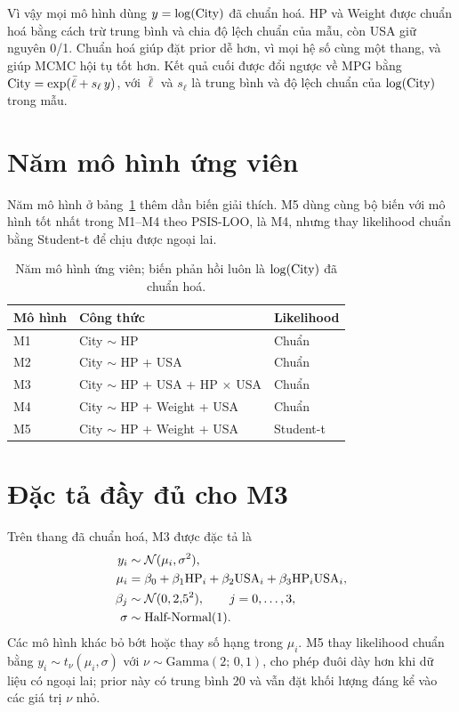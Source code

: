 \documentclass[12pt,a4paper]{report}
\begin{document}

Vì vậy mọi mô hình dùng $y = \log(\mathrm{City})$ đã chuẩn hoá. HP và Weight được
chuẩn hoá bằng cách trừ trung bình và chia độ lệch chuẩn của mẫu, còn USA giữ
nguyên 0/1. Chuẩn hoá giúp đặt prior dễ hơn, vì mọi hệ số cùng một thang, và
giúp MCMC hội tụ tốt hơn. Kết quả cuối được đổi ngược về MPG bằng
$\mathrm{City} = \exp(\bar{\ell} + s_\ell\, y)$, với $\bar{\ell}$ và $s_\ell$ là trung
bình và độ lệch chuẩn của $\log(\mathrm{City})$ trong mẫu.

\section{Năm mô hình ứng viên}
\label{sec:candidates}

Năm mô hình ở bảng~\ref{tab:models} thêm dần biến giải thích. M5 dùng cùng bộ
biến với mô hình tốt nhất trong M1--M4 theo PSIS-LOO, là M4, nhưng thay
likelihood chuẩn bằng Student-t để chịu được ngoại lai.

\begin{table}[tp]
  \centering
  \caption{Năm mô hình ứng viên; biến phản hồi luôn là $\log(\mathrm{City})$ đã chuẩn
    hoá.}
  \label{tab:models}
  \begin{tabular}{lll}
    \toprule
    Mô hình & Công thức & Likelihood \\
    \midrule
    M1 & City $\sim$ HP                        & Chuẩn \\
    M2 & City $\sim$ HP + USA                  & Chuẩn \\
    M3 & City $\sim$ HP + USA + HP $\times$ USA & Chuẩn \\
    M4 & City $\sim$ HP + Weight + USA         & Chuẩn \\
    M5 & City $\sim$ HP + Weight + USA         & Student-t \\
    \bottomrule
  \end{tabular}
\end{table}

\section{Đặc tả đầy đủ cho M3}

Trên thang đã chuẩn hoá, M3 được đặc tả là
%
\begin{equation}
  \label{eq:m3}
  \begin{aligned}
    y_i &\sim \mathcal{N}(\mu_i, \sigma^2), \\
    \mu_i &= \beta_0 + \beta_1 \mathrm{HP}_i + \beta_2 \mathrm{USA}_i + \beta_3 \mathrm{HP}_i \mathrm{USA}_i, \\
    \beta_j &\sim \mathcal{N}(0, 2{,}5^2), \qquad j = 0, \dots, 3, \\
    \sigma &\sim \text{Half-Normal}(1).
  \end{aligned}
\end{equation}
%
Các mô hình khác bỏ bớt hoặc thay số hạng trong $\mu_i$. M5 thay likelihood chuẩn
bằng $y_i \sim t_\nu(\mu_i, \sigma)$ với $\nu \sim \text{Gamma}(2;\, 0{,}1)$, cho
phép đuôi dày hơn khi dữ liệu có ngoại lai; prior này có trung bình 20 và vẫn
đặt khối lượng đáng kể vào các giá trị $\nu$ nhỏ.
\end{document}
